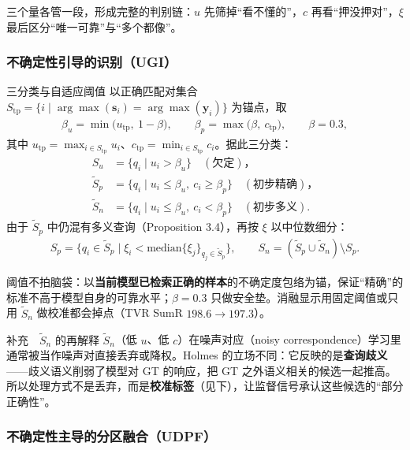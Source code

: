 \documentclass[11pt,a4paper,UTF8,fontset=windows]{ctexart}
\newcommand{\term}[1]{\textbf{#1}}
\newcommand{\vect}[1]{\boldsymbol{#1}}
\begin{document}
三个量各管一段，形成完整的判别链：$u$ 先筛掉“看不懂的”，$c$ 再看“押没押对”，$\xi$ 最后区分“唯一可靠”与“多个都像”。

\subsubsection{不确定性引导的识别（UGI）}

\begin{structbox}{三分类与自适应阈值}
以正确匹配对集合 $S_{\mathrm{tp}}=\{i \mid \arg\max(\vect s_i)=\arg\max(\vect y_i)\}$ 为锚点，取
\begin{align}
\beta_u = \min\!\big(u_{\mathrm{tp}},\ 1-\beta\big),\qquad
\beta_p = \max\!\big(\beta,\ c_{\mathrm{tp}}\big),\qquad \beta = 0.3,
\end{align}
其中 $u_{\mathrm{tp}}=\max_{i\in S_{\mathrm{tp}}} u_i$、$c_{\mathrm{tp}}=\min_{i\in S_{\mathrm{tp}}} c_i$。据此三分类：
\begin{align}
S_u &= \{q_i \mid u_i > \beta_u\} \quad(\text{欠定})，\\
\tilde S_p &= \{q_i \mid u_i \le \beta_u,\ c_i \ge \beta_p\} \quad(\text{初步精确})，\\
\tilde S_n &= \{q_i \mid u_i \le \beta_u,\ c_i < \beta_p\} \quad(\text{初步多义}).
\end{align}
由于 $\tilde S_p$ 中仍混有多义查询（Proposition 3.4），再按 $\xi$ 以中位数细分：
\begin{align}
S_p = \{q_i\in\tilde S_p \mid \xi_i < \mathrm{median}\{\xi_j\}_{q_j\in \tilde S_p}\},\qquad
S_n = (\tilde S_p\cup\tilde S_n)\setminus S_p .
\end{align}
\end{structbox}

阈值不拍脑袋：以\term{当前模型已检索正确的样本}的不确定度包络为锚，保证“精确”的标准不高于模型自身的可靠水平；$\beta=0.3$ 只做安全垫。消融显示用固定阈值或只用 $\tilde S_n$ 做校准都会掉点（TVR SumR $198.6\to 197.3$）。

\begin{greybox}{补充　$\tilde S_n$ 的再解释}
$\tilde S_n$（低 $u$、低 $c$）在噪声对应（noisy correspondence）学习里通常被当作噪声对直接丢弃或降权。Holmes 的立场不同：它反映的是\term{查询歧义}——歧义语义削弱了模型对 GT 的响应，把 GT 之外语义相关的候选一起推高。所以处理方式不是丢弃，而是\term{校准标签}（见下），让监督信号承认这些候选的“部分正确性”。
\end{greybox}

\subsubsection{不确定性主导的分区融合（UDPF）}
\end{document}
